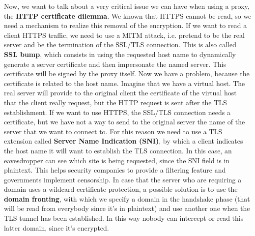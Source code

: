 \documentclass[11pt]{article}
\begin{document}
Now, we want to talk about a very critical issue we can have when using a proxy, the \textbf{HTTP certificate dilemma}. We known that HTTPS cannot be read, so we need a mechanism to realize this removal of the encryption. If we want to read a client HTTPS traffic, we need to use a MITM attack, i.e. pretend to be the real server and be the termination of the SSL/TLS connection. This is also called \textbf{SSL bump}, which consists in using the requested host name to dynamically generate a server certificate and then impersonate the named server. This certificate will be signed by the proxy itself. Now we have a problem, because the certificate is related to the host name. Imagine that we have a virtual host. The real server will provide to the original client the certificate of the virtual host that the client really request, but the HTTP request is sent after the TLS establishment. If we want to use HTTPS, the SSL/TLS connection needs a certificate, but we have not a way to send to the original server the name of the server that we want to connect to. For this reason we need to use a TLS extension called \textbf{Server Name Indication (SNI)}, by which a client indicates the host name it will want to establish the TLS connection. In this case, an eavesdropper can see which site is being requested, since the SNI field is in plaintext. This helps security companies to provide a filtering feature and governments implement censorship. In case that the server who are requiring a domain uses a wildcard certificate protection, a possible solution is to use the \textbf{domain fronting}, with which we specify a domain in the handshake phase (that will be read from everybody since it's in plaintext) and use another one when the TLS tunnel has been established. In this way nobody can intercept or read this latter domain, since it's encrypted.
\end{document}
